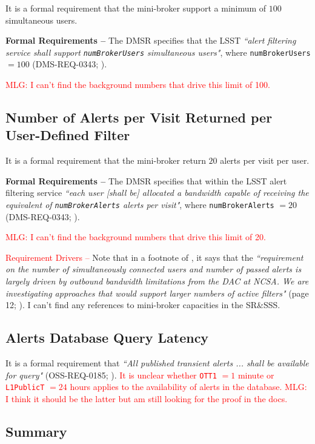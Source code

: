 \documentclass[DM,authoryear,toc]{lsstdoc}
\begin{document}
It is a formal requirement that the mini-broker support a minimum of $100$ simultaneous users.

{\bf Formal Requirements --} The DMSR specifies that the LSST {\it ``alert filtering service shall support {\tt numBrokerUsers} simultaneous users"}, where {\tt numBrokerUsers} $=100$ (DMS-REQ-0343; ).

\textcolor{red}{MLG: I can't find the background numbers that drive this limit of 100.}

\subsection{Number of Alerts per Visit Returned per User-Defined Filter}\label{ssec:minib_returns}

It is a formal requirement that the mini-broker return $20$ alerts per visit per user.

{\bf Formal Requirements --} The DMSR specifies that within the LSST alert filtering service {\it ``each user [shall be] allocated a bandwidth capable of receiving the equivalent of {\tt numBrokerAlerts} alerts per visit"}, where {\tt numBrokerAlerts} $=20$ (DMS-REQ-0343; ).

\textcolor{red}{MLG: I can't find the background numbers that drive this limit of 20.}

\textcolor{red}{Requirement Drivers --} Note that in a footnote of , it says that the {\it ``requirement on the number of simultaneously connected users and number of passed alerts is largely driven by outbound bandwidth limitations from the DAC at NCSA. We are investigating approaches that would support larger numbers of active filters"} (page 12; ).  I can't find any references to mini-broker capacities in the SR\&SSS.


\subsection{Alerts Database Query Latency}

It is a formal requirement that {\it ``All published transient alerts ... shall be available for query"} (OSS-REQ-0185; ). \textcolor{red}{It is unclear whether {\tt OTT1} $=1$ minute or {\tt L1PublicT} $=24$ hours applies to the availability of alerts in the database. MLG: I think it should be the latter but am still looking for the proof in the docs.}




\subsection{Summary}


\clearpage


\end{document}
